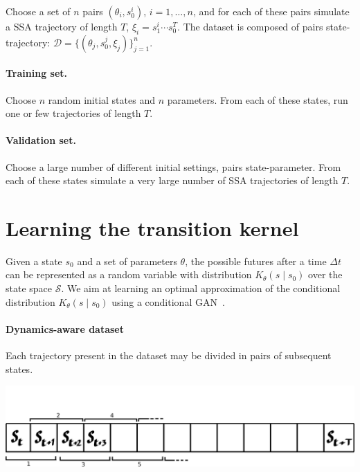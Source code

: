 \documentclass{article}
\begin{document}
Choose a set of $n$ pairs $(\theta_i,s_0^i)$, $i=1,\dots,n$, and for each of these pairs simulate a SSA trajectory of length $T$, $\xi_i = s_1^i\cdots s_0^T$. The dataset is composed of pairs state-trajectory: $\mathcal{D}= \{(\theta_j,s_0^j,\xi_j)\}_{j=1}^n$.


\paragraph{Training set. } Choose $n$ random initial states and $n$ parameters. 
 From each of these states, run one or few trajectories of length $T$.

\paragraph{Validation set.} Choose a large number of different initial settings, pairs state-parameter. From each of these states simulate a very large number of SSA trajectories of length $T$.


\section{Learning the transition kernel}

Given a state $s_0$ and a set of parameters $\theta$, the possible futures after a time $\Delta t$ can be represented as a random variable with distribution $K_{\theta}(s\mid s_0)$ over the state space $\mathcal{S}$. We aim at learning an optimal approximation of the conditional distribution $K_{\theta}(s\mid s_0)$ using a conditional GAN~\cite{mirza2014conditional}.

\paragraph{Dynamics-aware dataset}
Each trajectory present in the dataset may be divided in pairs of subsequent states. 
\begin{center}
    \includegraphics[scale = 0.5]{new_img/trajectory.png}
\end{center}
\end{document}

